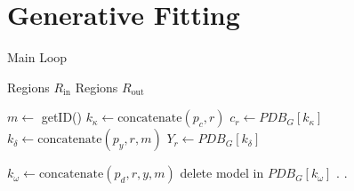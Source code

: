 \section{Generative Fitting} \label{sec:generative_fitting}

\begin{algorithm}
    \caption{Main Loop}
    \label{alg:generative_fitting}
 
    \begin{algorithmic}[1]
        \REQUIRE Regions $R_{\text{in}}$
        \ENSURE Regions $R_{\text{out}}$

        \STATE $m \leftarrow$ getID()
            \STATE $k_\kappa \leftarrow \text{concatenate}(p_c, r)$
            \STATE $c_r \leftarrow PDB_G[k_\kappa]$ %
            \STATE $k_\delta \leftarrow \text{concatenate}(p_y, r, m)$
            \STATE $Y_r \leftarrow PDB_G[k_\delta]$ %
            
                \STATE $k_\omega \leftarrow \text{concatenate}(p_d, r, y, m)$ 
                    \STATE delete model in $PDB_G[k_\omega]$
                \ELSE
                    \STATE . %
                    \STATE . %
                \ENDIF
            
            \ENDFOR          
 
            
        \ENDFOR

    \end{algorithmic}
 \end{algorithm}





